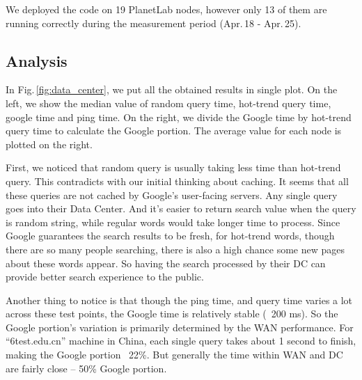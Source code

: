 We deployed the code on 19 PlanetLab nodes, however only 13 of them are running correctly during the measurement period (Apr.\,18 - Apr.\,25).

\subsection{Analysis}
\label{sec:analysis}

In Fig.\,\ref{fig:data_center}, we put all the obtained results in single plot. On the left, we show the median value of random query time, hot-trend query time, google time and ping time. On the right, we divide the Google time by hot-trend query time to calculate the Google portion. The average value for each node is plotted on the right.

First, we noticed that random query is usually taking less time than hot-trend query. This contradicts with our initial thinking about caching. It seems that all these queries are not cached by Google's user-facing servers. Any single query goes into their Data Center. And it's easier to return search value when the query is random string, while regular words would take longer time to process. Since Google guarantees the search results to be fresh, for hot-trend words, though there are so many people searching, there is also a high chance some new pages about these words appear. So having the search processed by their DC can provide better search experience to the public.

Another thing to notice is that though the ping time, and query time varies a lot across these test points, the Google time is relatively stable (~200 ms). So the Google portion's variation is primarily determined by the WAN performance. For ``6test.edu.cn'' machine in China, each single query takes about 1 second to finish, making the Google portion ~22\%. But generally the time within WAN and DC are fairly close -- 50\% Google portion.

